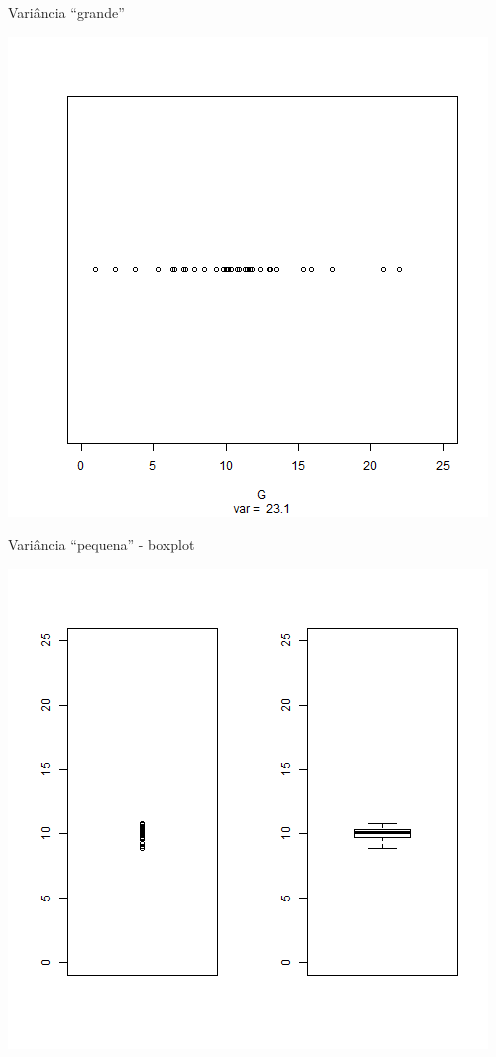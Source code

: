 \documentclass{beamer}
\begin{document}
\begin{frame}{Variância ``grande''}
  \begin{center}
    \includegraphics[height=.8\textheight]{Cap17/dot-G}
  \end{center}
\end{frame}

\begin{frame}{Variância ``pequena'' - boxplot}
  \begin{center}
    \includegraphics[height=.8\textheight]{Cap17/dot-box-P}
  \end{center}
\end{frame}
\end{document}
